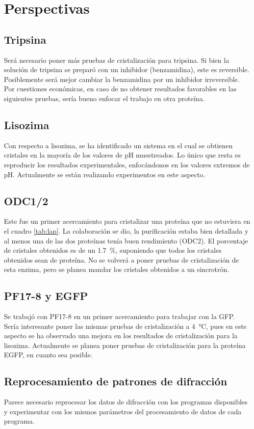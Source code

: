 \documentclass[11pt,letterpaper]{article}
\begin{document}
\section{Perspectivas}
 	
\subsection{Tripsina}
Será necesario poner más pruebas de cristalización para tripsina. Si bien la solución de tripsina se preparó con un inhibidor (benzamidina), este es reversible. Posiblemente será mejor cambiar la benzamidina por un inhibidor irreversible. Por cuestiones económicas, en caso de no obtener resultados favorables en las siguientes pruebas, sería bueno enfocar el trabajo en otra proteína.

\subsection{Lisozima}
Con respecto a lisozima, se ha identificado un sistema en el cual se obtienen cristales en la mayoría de los valores de pH muestreados. Lo único que resta es reproducir los resultados experimentales, enfocándonos en los valores extremos de pH. Actualmente se están realizando experimentos en este aspecto.

\subsection{ODC1/2}
Este fue un primer acercamiento para cristalizar una proteína que no estuviera en el cuadro \ref{tab:lap}. La colaboración se dio, la purificación estaba bien detallada y al menos una de las dos proteínas tenía buen rendimiento (ODC2). El porcentaje de cristales obtenidos es de un \SI{1.7}{\percent}, suponiendo que todos los cristales obtenidos sean de proteína. No se volverá a poner pruebas de cristalización de esta enzima, pero se planea mandar los cristales obtenidos a un sincrotrón. 

\subsection{PF17-8 y EGFP}
Se trabajó con PF17-8 en un primer acercamiento para trabajar con la GFP. Sería interesante poner las mismas pruebas de cristalización a \SI{4}{\degreeCelsius}, pues en este aspecto se ha observado una mejora en los resultados de cristalización para la lisozima. Actualmente se planea poner pruebas de cristalización para la proteína EGFP, en cuanto sea posible.

\subsection{Reprocesamiento de patrones de difracción}
Parece necesario reprocesar los datos de difracción con los programas disponibles y experimentar con los mismos parámetros del procesamiento de datos de cada programa.


\end{document}
